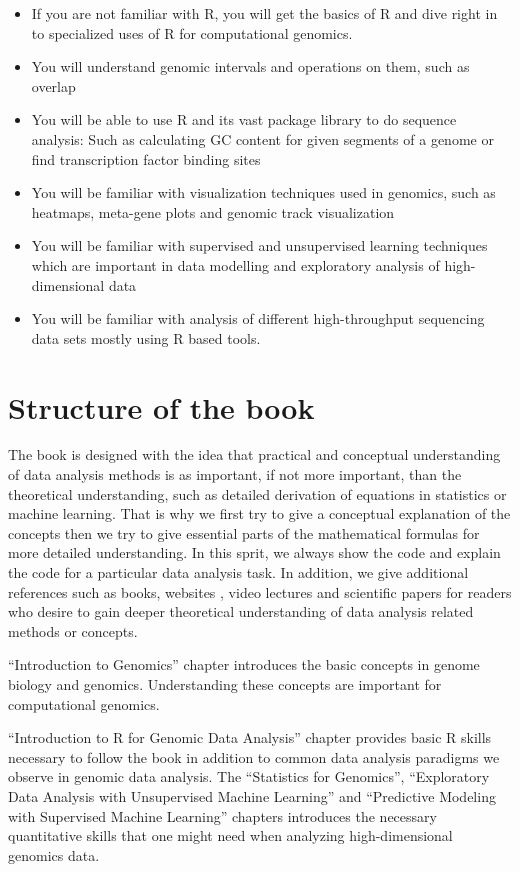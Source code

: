 \documentclass[12pt,]{krantz}
\providecommand{\tightlist}{%
  \setlength{\itemsep}{0pt}\setlength{\parskip}{0pt}}
\begin{document}
\begin{itemize}
\tightlist
\item
  If you are not familiar with R, you will get the basics of R and dive right in to specialized uses of R for computational genomics.
\item
  You will understand genomic intervals and operations on them, such as overlap
\item
  You will be able to use R and its vast package library to do sequence analysis: Such as calculating GC content for given segments of a genome or find transcription factor binding sites
\item
  You will be familiar with visualization techniques used in genomics, such as heatmaps, meta-gene plots and genomic track visualization
\item
  You will be familiar with supervised and unsupervised learning techniques which are important in data modelling and exploratory analysis of high-dimensional data
\item
  You will be familiar with analysis of different high-throughput sequencing data
  sets mostly using R based tools.
\end{itemize}

\hypertarget{structure-of-the-book}{%
\section*{Structure of the book}\label{structure-of-the-book}}


The book is designed with the idea that practical and conceptual
understanding of data analysis methods is as important, if not more important, than the theoretical understanding, such as detailed derivation of equations in statistics or machine learning. That is why we first try to give a conceptual explanation of the concepts then we try to give essential parts of the mathematical formulas for more detailed understanding. In this sprit, we always show the code and
explain the code for a particular data analysis task. In addition, we give additional references such as books, websites , video lectures and scientific papers for readers who desire to gain deeper theoretical understanding of data analysis related methods or concepts.

``Introduction to Genomics'' chapter introduces the basic concepts in genome biology and genomics. Understanding these concepts are important for computational genomics.

``Introduction to R for Genomic Data Analysis'' chapter provides basic R skills necessary to follow the book in addition to common data analysis paradigms we observe in genomic data analysis. The ``Statistics for Genomics'', ``Exploratory Data Analysis with Unsupervised Machine Learning'' and ``Predictive Modeling with Supervised Machine Learning'' chapters introduces the necessary quantitative skills that one might need when analyzing high-dimensional genomics data.
\end{document}
